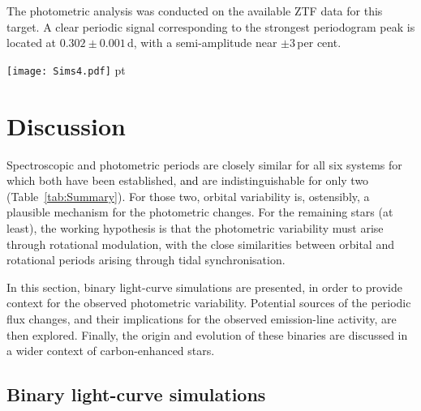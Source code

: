 \documentclass[fleqn,usenatbib,useAMS]{mnras}
\newcommand{\lw}[1]{\textcolor{black}{#1}}
\begin{document}
The photometric analysis was conducted on the available ZTF data for this target.  A clear periodic signal corresponding to the strongest periodogram peak is located at $0.302\pm0.001$\,d, with a semi-amplitude near $\pm3$\,per cent.  






\begin{figure*}
\texttt{[image: Sims4.pdf]}
 pt
\caption{Representative $R$-band light-curve simulations (detailed in Section~\ref{sec:binsimz}) for orbital periods representative of the shortest yet measured or suggested for dC stars.  The grey bar in each panel represents the range of peak-to-peak variations observed in the dC-star sample (0.028--0.060\,mag).  The top-left panel demonstrates the influence of tidal distortion alone, while the models represented at top right have identical parameters but include heating (irradiation).  The lower-left panel explores the effect of reduced heating (i.e., from cooler white-dwarf companions), and the bottom-right panel shows the effects of decreasing inclination.
\label{fig:Sims}}
\end{figure*}



\section{Discussion}

Spectroscopic and photometric periods are closely similar for all six systems for which both have been established, \lw{and} are indistinguishable for only two (Table~\ref{tab:Summary}).  For those two, orbital variability is, ostensibly, a plausible mechanism for the photometric changes.  For the remaining stars (at least), the working hypothesis is that the photometric variability must arise through rotational modulation, with the close similarities between orbital and rotational periods arising through tidal synchronisation.

In this section, binary light-curve simulations are presented, in order to provide context for the observed photometric variability.  Potential sources of the periodic flux changes, and their implications for the observed emission-line activity, are then explored.  Finally, the origin and evolution of these binaries are discussed in a wider context of carbon-enhanced stars.  


\subsection{Binary light-curve simulations}
\label{sec:binsimz}
\end{document}
